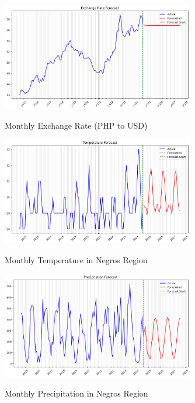 \documentclass[11pt]{article}
\begin{document}
    \begin{figure}[H]
        \caption*{Monthly Exchange Rate (PHP to USD)}
        \centering
        \includegraphics[width=0.75\textwidth]{exchange_rate_plot.png}
        \label{exchange_rate_plot}
    \end{figure}

    \begin{figure}[H]
        \caption*{Monthly Temperature in Negros Region }
        \centering
        \includegraphics[width=0.75\textwidth]{temperature_plot.png}
        \label{temperature_plot}
    \end{figure}

    \begin{figure}[H]
        \caption*{Monthly Precipitation in Negros Region}
        \centering
        \includegraphics[width=0.75\textwidth]{precipitation_plot.png}
        \label{precipitation_plot}
    \end{figure}
\end{document}
